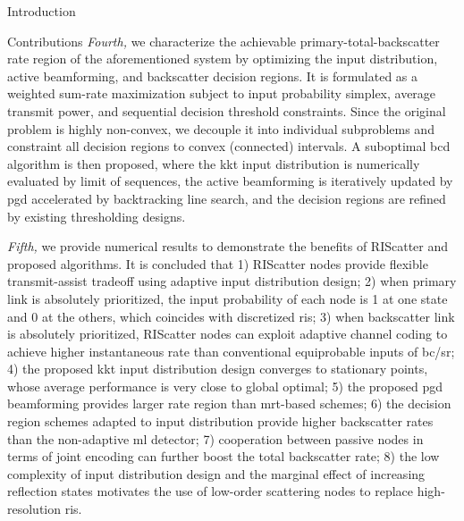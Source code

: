 \documentclass[journal]{IEEEtran}
\begin{document}
\begin{section}{Introduction}
\begin{subsection}{Contributions}
		\emph{Fourth,} we characterize the achievable primary-total-backscatter rate region of the aforementioned system by optimizing the input distribution, active beamforming, and backscatter decision regions.
		It is formulated as a weighted sum-rate maximization subject to input probability simplex, average transmit power, and sequential decision threshold constraints.
		Since the original problem is highly non-convex, we decouple it into individual subproblems and constraint all decision regions to convex (connected) intervals.
		A suboptimal \gls{bcd} algorithm is then proposed, where the \gls{kkt} input distribution is numerically evaluated by limit of sequences, the active beamforming is iteratively updated by \gls{pgd} accelerated by backtracking line search, and the decision regions are refined by existing thresholding designs.

		\emph{Fifth,} we provide numerical results to demonstrate the benefits of RIScatter and proposed algorithms.
		It is concluded that
		1) RIScatter nodes provide flexible transmit-assist tradeoff using adaptive input distribution design;
		2) when primary link is absolutely prioritized, the input probability of each node is \num{1} at one state and \num{0} at the others, which coincides with discretized \gls{ris};
		3) when backscatter link is absolutely prioritized, RIScatter nodes can exploit adaptive channel coding to achieve higher instantaneous rate than conventional equiprobable inputs of \gls{bc}/\gls{sr};
		4) the proposed \gls{kkt} input distribution design converges to stationary points, whose average performance is very close to global optimal;
		5) the proposed \gls{pgd} beamforming provides larger rate region than \gls{mrt}-based schemes;
		6) the decision region schemes adapted to input distribution provide higher backscatter rates than the non-adaptive \gls{ml} detector;
		7) cooperation between passive nodes in terms of joint encoding can further boost the total backscatter rate;
		8) the low complexity of input distribution design and the marginal effect of increasing reflection states motivates the use of low-order scattering nodes to replace high-resolution \gls{ris}.
	\end{subsection}


\end{section}
\end{document}
